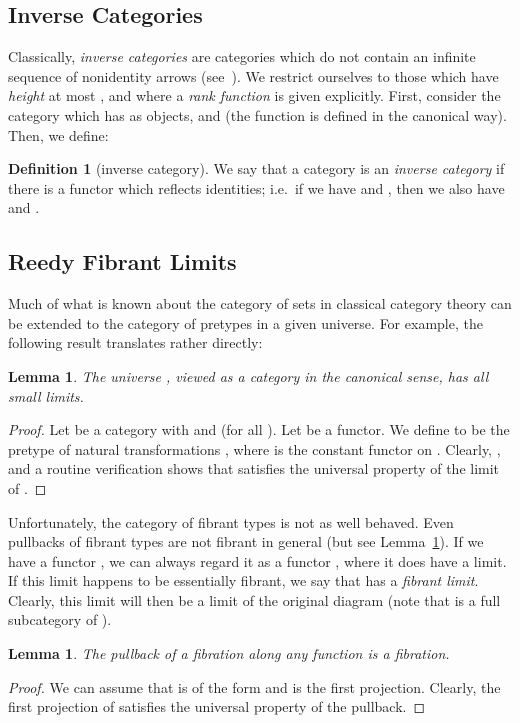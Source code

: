\documentclass[a4paper,reqno]{amsart}
\theoremstyle{plain}
\newtheorem{lemma}[theorem]{Lemma}
\theoremstyle{definition}
\newtheorem{definition}[theorem]{Definition}
\begin{document}
\subsection{Inverse Categories}


Classically, \emph{inverse categories} are categories which do not contain an infinite sequence of nonidentity arrows (see~\cite{shulman_inversediagrams}).
We restrict ourselves to those which have \emph{height} at most , and where a \emph{rank function} is given explicitly.
First, consider the category  which has  as objects, and  (the function  is defined in the canonical way).
Then, we define:
\begin{definition}[inverse category]
 We say that a category  is an \emph{inverse category}
 if there is a functor  which reflects identities; i.e.\ if we have  and , then we also have  and .
\end{definition}


\subsection{Reedy Fibrant Limits}

Much of what is known about the category of sets in classical category theory
can be extended to the category of pretypes in a given universe. 
For example, the following result translates rather directly:

\begin{lemma} \label{lem:all-strict-limits}
The universe , viewed as a category in the canonical sense, has all small limits.
\end{lemma}
\begin{proof}
Let  be a category with  and  (for all ).
Let  be a
functor. 
We define  to be the pretype of natural transformations , where 
 is the constant functor on .  
Clearly, , and
a routine verification shows that  satisfies the universal property of the
limit of .
\end{proof}

Unfortunately, the category  of fibrant types is not as well behaved.  
Even pullbacks of fibrant types are not fibrant in general (but see Lemma~\ref{prop:fibrant-pullback}). 
If we have a functor , we can always regard it as a functor , where it does have a limit.
If this limit happens to be essentially fibrant, we say that  has a \emph{fibrant limit}.
Clearly, this limit will then be a limit of the original diagram  (note that  is a full subcategory of ).

\begin{lemma}\label{prop:fibrant-pullback}
The pullback of a fibration  along any function  is a fibration.
\end{lemma}
\begin{proof}
We can assume that  is of the form  and  is the first projection.
Clearly, the first projection of 
satisfies the universal property of the pullback.
\end{proof}
\end{document}
